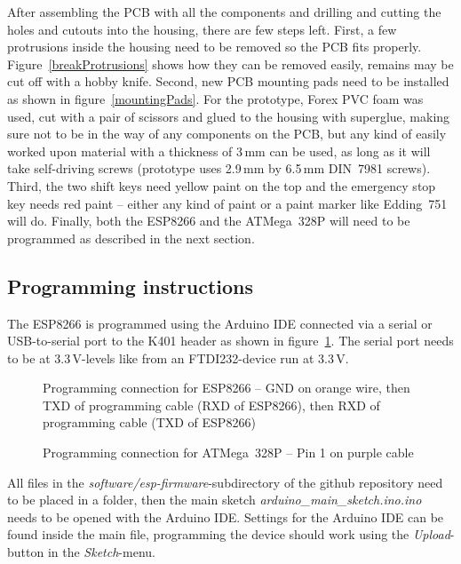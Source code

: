 \documentclass[11pt,a4paper]{scrartcl}
\begin{document}
After assembling the PCB with all the components and drilling and cutting the holes and cutouts into the housing, there are few steps left. First, a few protrusions inside the housing need to be removed so the PCB fits properly. Figure~\ref{breakProtrusions} shows how they can be removed easily, remains may be cut off with a hobby knife. Second, new PCB mounting pads need to be installed as shown in figure~\ref{mountingPads}. For the prototype, Forex PVC foam was used, cut with a pair of scissors and glued to the housing with superglue, making sure not to be in the way of any components on the PCB, but any kind of easily worked upon material with a thickness of 3\,mm can be used, as long as it will take self-driving screws (prototype uses 2.9\,mm by 6.5\,mm DIN~7981 screws). Third, the two shift keys need yellow paint on the top and the emergency stop key needs red paint -- either any kind of paint or a paint marker like Edding~751 will do. Finally, both the ESP8266 and the ATMega~328P will need to be programmed as described in the next section.

\subsection{Programming instructions}

The ESP8266 is programmed using the Arduino IDE connected via a serial or USB-to-serial port to the K401 header as shown in figure~\ref{progESP}. The serial port needs to be at 3.3\,V-levels like from an FTDI232-device run at 3.3\,V.

\begin{figure}[tbh]
  \centering
  \caption{Programming connection for ESP8266 -- GND on orange wire, then TXD of programming cable (RXD of ESP8266), then RXD of programming cable (TXD of ESP8266)}
  \label{progESP}
\end{figure}

\begin{figure}[tbh]
  \centering
  \caption{Programming connection for ATMega~328P -- Pin 1 on purple cable}
  \label{progAVR}
\end{figure}

All files in the \textit{software/esp-firmware}-subdirectory of the github repository need to be placed in a folder, then the main sketch \textit{arduino\_main\_sketch.ino.ino} needs to be opened with the Arduino IDE. Settings for the Arduino IDE can be found inside the main file, programming the device should work using the \textit{Upload}-button in the \textit{Sketch}-menu.
\end{document}
